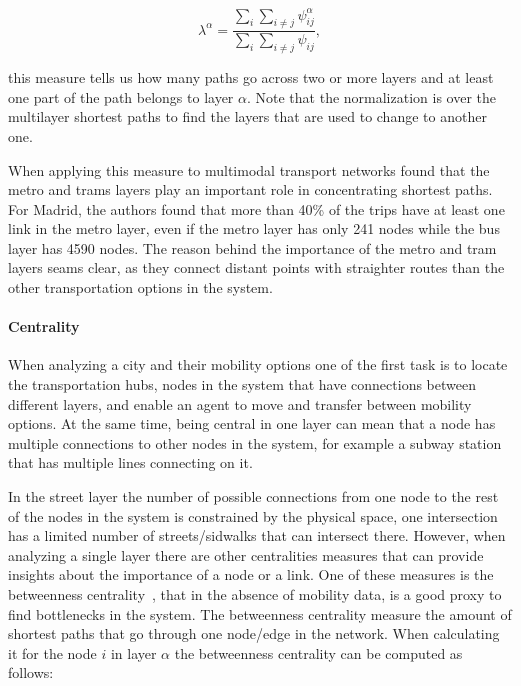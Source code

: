 \begin{equation}\label{eq:layer_interdependency}
    \lambda^{\alpha}=\frac{\sum_i\sum_{i\neq j}\psi_{ij}^{\alpha}}{\sum_i\sum_{i\neq j}\psi_{ij}},
\end{equation}

this measure tells us how many paths go across two or more layers and at least one part of the path belongs to layer $\alpha$. Note that the normalization is over the multilayer shortest paths to find the layers that are used to change to another one.

When applying this measure to multimodal transport networks \cite{Aleta2017Multilayer} found that the metro and trams layers play an important role in concentrating shortest paths. For Madrid, the authors found that more than 40\% of the trips have at least one link in the metro layer, even if the metro layer has only 241 nodes while the bus layer has 4590 nodes. The reason behind the importance of the metro and tram layers seams clear, as they connect distant points with straighter routes than the other transportation options in the system.

\paragraph*{Centrality}
When analyzing a city and their mobility options one of the first task is to locate the transportation hubs, nodes in the system that have connections between different layers, and enable an agent to move and transfer between mobility options. At the same time, being central in one layer can mean that a node has multiple connections to other nodes in the system, for example a subway station that has multiple lines connecting on it.

In the street layer the number of possible connections from one node to the rest of the nodes in the system is constrained by the physical space, one intersection has a limited number of streets/sidwalks that can intersect there. However, when analyzing a single layer there are other centralities measures that can provide insights about the importance of a node or a link. One of these measures is the betweenness centrality~\cite{Freeman1977Centrality}, that in the absence of mobility data, is a good proxy to find bottlenecks in the system. The betweenness centrality measure the amount of shortest paths that go through one node/edge in the network. When calculating it for the node $i$ in layer $\alpha$ the betweenness centrality can be computed as follows:

